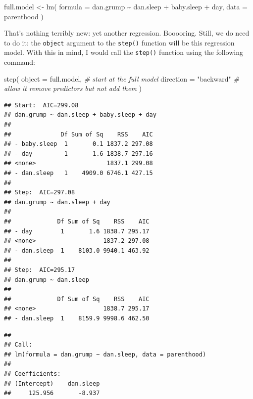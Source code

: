 \documentclass[
]{book}
\newenvironment{Shaded}{\begin{snugshade}}{\end{snugshade}}
\newcommand{\AttributeTok}[1]{\textcolor[rgb]{0.77,0.63,0.00}{#1}}
\newcommand{\CommentTok}[1]{\textcolor[rgb]{0.56,0.35,0.01}{\textit{#1}}}
\newcommand{\FunctionTok}[1]{\textcolor[rgb]{0.00,0.00,0.00}{#1}}
\newcommand{\NormalTok}[1]{#1}
\newcommand{\OtherTok}[1]{\textcolor[rgb]{0.56,0.35,0.01}{#1}}
\newcommand{\SpecialCharTok}[1]{\textcolor[rgb]{0.00,0.00,0.00}{#1}}
\newcommand{\StringTok}[1]{\textcolor[rgb]{0.31,0.60,0.02}{#1}}
\begin{document}
\begin{Shaded}
\begin{Highlighting}[]
\NormalTok{full.model }\OtherTok{\textless{}{-}} \FunctionTok{lm}\NormalTok{( }\AttributeTok{formula =}\NormalTok{ dan.grump }\SpecialCharTok{\textasciitilde{}}\NormalTok{ dan.sleep }\SpecialCharTok{+}\NormalTok{ baby.sleep }\SpecialCharTok{+}\NormalTok{ day,  }
                   \AttributeTok{data =}\NormalTok{ parenthood  }
\NormalTok{ )}
\end{Highlighting}
\end{Shaded}

That's nothing terribly new: yet another regression. Booooring. Still, we do need to do it: the \texttt{object} argument to the \texttt{step()} function will be this regression model. With this in mind, I would call the \texttt{step()} function using the following command:

\begin{Shaded}
\begin{Highlighting}[]
 \FunctionTok{step}\NormalTok{( }\AttributeTok{object =}\NormalTok{ full.model,     }\CommentTok{\# start at the full model}
       \AttributeTok{direction =} \StringTok{"backward"}   \CommentTok{\# allow it remove predictors but not add them}
\NormalTok{ )}
\end{Highlighting}
\end{Shaded}

\begin{verbatim}
## Start:  AIC=299.08
## dan.grump ~ dan.sleep + baby.sleep + day
## 
##              Df Sum of Sq    RSS    AIC
## - baby.sleep  1       0.1 1837.2 297.08
## - day         1       1.6 1838.7 297.16
## <none>                    1837.1 299.08
## - dan.sleep   1    4909.0 6746.1 427.15
## 
## Step:  AIC=297.08
## dan.grump ~ dan.sleep + day
## 
##             Df Sum of Sq    RSS    AIC
## - day        1       1.6 1838.7 295.17
## <none>                   1837.2 297.08
## - dan.sleep  1    8103.0 9940.1 463.92
## 
## Step:  AIC=295.17
## dan.grump ~ dan.sleep
## 
##             Df Sum of Sq    RSS    AIC
## <none>                   1838.7 295.17
## - dan.sleep  1    8159.9 9998.6 462.50
\end{verbatim}

\begin{verbatim}
## 
## Call:
## lm(formula = dan.grump ~ dan.sleep, data = parenthood)
## 
## Coefficients:
## (Intercept)    dan.sleep  
##     125.956       -8.937
\end{verbatim}
\end{document}
